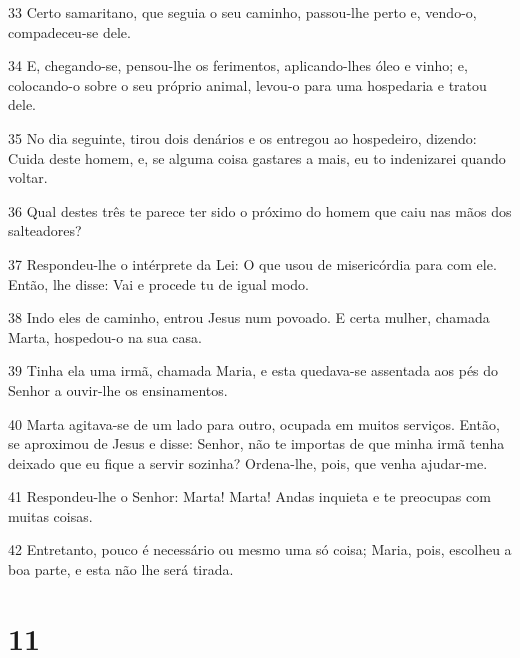 \par 33 Certo samaritano, que seguia o seu caminho, passou-lhe perto e, vendo-o, compadeceu-se dele.
\par 34 E, chegando-se, pensou-lhe os ferimentos, aplicando-lhes óleo e vinho; e, colocando-o sobre o seu próprio animal, levou-o para uma hospedaria e tratou dele.
\par 35 No dia seguinte, tirou dois denários e os entregou ao hospedeiro, dizendo: Cuida deste homem, e, se alguma coisa gastares a mais, eu to indenizarei quando voltar.
\par 36 Qual destes três te parece ter sido o próximo do homem que caiu nas mãos dos salteadores?
\par 37 Respondeu-lhe o intérprete da Lei: O que usou de misericórdia para com ele. Então, lhe disse: Vai e procede tu de igual modo.
\par 38 Indo eles de caminho, entrou Jesus num povoado. E certa mulher, chamada Marta, hospedou-o na sua casa.
\par 39 Tinha ela uma irmã, chamada Maria, e esta quedava-se assentada aos pés do Senhor a ouvir-lhe os ensinamentos.
\par 40 Marta agitava-se de um lado para outro, ocupada em muitos serviços. Então, se aproximou de Jesus e disse: Senhor, não te importas de que minha irmã tenha deixado que eu fique a servir sozinha? Ordena-lhe, pois, que venha ajudar-me.
\par 41 Respondeu-lhe o Senhor: Marta! Marta! Andas inquieta e te preocupas com muitas coisas.
\par 42 Entretanto, pouco é necessário ou mesmo uma só coisa; Maria, pois, escolheu a boa parte, e esta não lhe será tirada.

\chapter{11}

